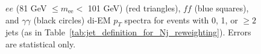 \documentclass[dissertation_bw.tex]{subfiles}
\begin{document}
\begin{figure}
	\caption{$ee$ (81 GeV $\leq m_{\mathrm{ee}} <$ 101 GeV) (red triangles), $\mathit{ff}$ (blue squares), and $\gamma\gamma$ (black circles) di-EM $p_{T}$ spectra for events with 0, 1, or $\geq 2$ jets (as in Table~\ref{tab:jet_definition_for_Nj_reweighting}).  Errors are statistical only.}
	\label{fig:dijet_pT}
\end{figure}

\begin{figure}
	\centering
	\hspace{1cm}
	\hspace{1cm}

\end{figure}
\end{document}
